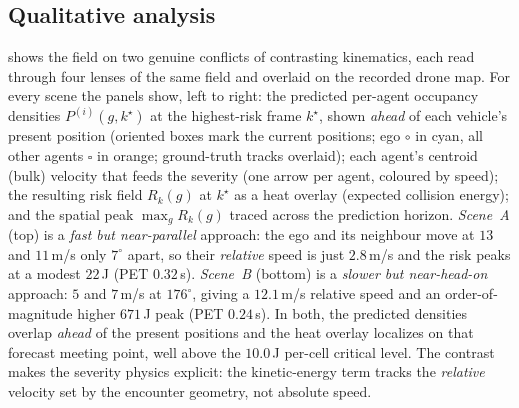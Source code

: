 \documentclass[journal]{IEEEtran}
\begin{document}
\subsection{Qualitative analysis}
\label{sec:results_qualitative}
 shows the field on two genuine conflicts of contrasting kinematics, each read through four lenses of the same field and overlaid on the recorded drone map. For every scene the panels show, left to right: the predicted per-agent occupancy densities $P^{(i)}(g,k^\star)$ at the highest-risk frame $k^\star$, shown \emph{ahead} of each vehicle's present position (oriented boxes mark the current positions; ego $\circ$ in cyan, all other agents $\square$ in orange; ground-truth tracks overlaid); each agent's centroid (bulk) velocity that feeds the severity (one arrow per agent, coloured by speed); the resulting risk field $R_k(g)$ at $k^\star$ as a heat overlay (expected collision energy); and the spatial peak $\max_g R_k(g)$ traced across the prediction horizon. \emph{Scene~A} (top) is a \emph{fast but near-parallel} approach: the ego and its neighbour move at $13$ and $11$\,m/s only $7^\circ$ apart, so their \emph{relative} speed is just $2.8$\,m/s and the risk peaks at a modest $22$\,J (PET $0.32$\,s). \emph{Scene~B} (bottom) is a \emph{slower but near-head-on} approach: $5$ and $7$\,m/s at $176^\circ$, giving a $12.1$\,m/s relative speed and an order-of-magnitude higher $671$\,J peak (PET $0.24$\,s). In both, the predicted densities overlap \emph{ahead} of the present positions and the heat overlay localizes on that forecast meeting point, well above the $10.0$\,J per-cell critical level. The contrast makes the severity physics explicit: the kinetic-energy term tracks the \emph{relative} velocity set by the encounter geometry, not absolute speed.
\end{document}
